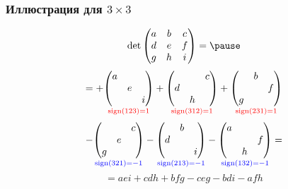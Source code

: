 \begin{frame}
    \frametitle{Иллюстрация для $3\times 3$}

    \[
    \det \begin{pmatrix}
        a & b & c \\
        d & e & f \\
        g & h & i \\
    \end{pmatrix} = \pause
    \]
\[
= +\underset{\textcolor{red}{\operatorname{sign}(123)=1}}{\begin{pmatrix}
    a &  &  \\
     & e &  \\
     &  & i \\
\end{pmatrix}} +
\underset{\textcolor{red}{\operatorname{sign}(312)=1}}{\begin{pmatrix}
     &  & c \\
    d &  &  \\
     & h &  \\
\end{pmatrix}} +
\underset{\textcolor{red}{\operatorname{sign}(231)=1}}{\begin{pmatrix}
     & b &  \\
     &  & f \\
    g &  &  \\
\end{pmatrix}}
\]
\[
- \underset{\textcolor{blue}{\operatorname{sign}(321)=-1}}{\begin{pmatrix}
     &  & c \\
     & e &  \\
    g &  &  \\
\end{pmatrix}} 
- \underset{\textcolor{blue}{\operatorname{sign}(213)=-1}}{\begin{pmatrix}
     & b & \\
    d &  &  \\
     &  & i \\
\end{pmatrix}} 
- \underset{\textcolor{blue}{\operatorname{sign}(132)=-1}}{\begin{pmatrix}
    a &  &  \\
     &  & f \\
     & h &  \\
\end{pmatrix}}=
\]
\pause
\[
= aei + cdh + bfg - ceg - bdi - afh
\]




\end{frame}



